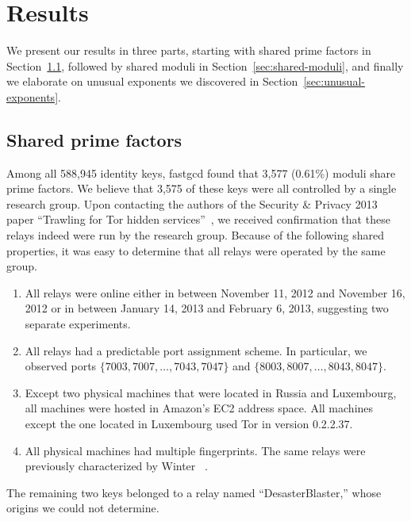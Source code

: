 \section{Results}
\label{sec:results}
We present our results in three parts, starting with shared prime factors in
Section~\ref{sec:shared-primes}, followed by shared moduli in
Section~\ref{sec:shared-moduli}, and finally we elaborate on unusual exponents
we discovered in Section~\ref{sec:unusual-exponents}.

\subsection{Shared prime factors}
\label{sec:shared-primes}
Among all 588,945 identity keys, fastgcd found that 3,577 (0.61\%) moduli share
prime factors.  We believe that 3,575 of these keys were all controlled by a
single research group.  Upon contacting the authors of the Security \& Privacy
2013 paper ``Trawling for Tor hidden services''~\cite{Biryukov2013a}, we
received confirmation that these relays indeed were run by the research group.
Because of the following shared properties, it was easy to determine that all
relays were operated by the same group.

\begin{enumerate}
	\item All relays were online either in between November 11, 2012 and
		November 16, 2012 or in between January 14, 2013 and February 6, 2013,
		suggesting two separate experiments.

	\item All relays had a predictable port assignment scheme.  In particular,
		we observed ports $\{7003, 7007, \dots, 7043, 7047\}$ and $\{8003, 8007,
		\dots, 8043, 8047\}$.

	\item Except two physical machines that were located in Russia and
		Luxembourg, all machines were hosted in Amazon's EC2 address space.  All
		machines except the one located in Luxembourg used Tor in version
		0.2.2.37.

	\item All physical machines had multiple fingerprints.  The same relays were
		previously characterized by Winter \ea~\cite[\S~5.1]{Winter2016a}.
\end{enumerate}

The remaining two keys belonged to a relay named ``DesasterBlaster,'' whose
origins we could not determine.

